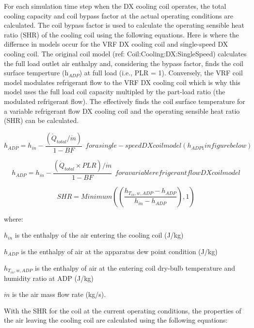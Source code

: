 For each simulation time step when the DX cooling coil operates, the total cooling capacity and coil bypass factor at the actual operating conditions are calculated. The coil bypass factor is used to calculate the operating sensible heat ratio (SHR) of the cooling coil using the following equations. Here is where the differnce in models occur for the VRF DX cooling coil and single-speed DX cooling coil. The original coil model (ref: Coil:Cooling:DX:SingleSpeed) calculates the full load outlet air enthalpy and, considering the bypass factor, finds the coil surface temperture (h\(_{ADP}\)) at full load (i.e., PLR = 1). Conversely, the VRF coil model modulates refrigerant flow to the VRF DX cooling coil which is why this model uses the full load coil capacity multipled by the part-load ratio (the modulated refrigerant flow). The effectively finds the coil surface temperature for a variable refrigerant flow DX cooling coil and the operating sensible heat ratio (SHR) can be calculated.

\begin{equation}
{h_{ADP}} = {h_{in}} - \frac{{\left( {{\dot{Q}_{total}}/ \dot{m}} \right)}}{{1 - BF}} ~~for a single-speed DX coil model (h_{ADP1} in figure below)
\end{equation}

\begin{equation}
{h_{ADP}} = {h_{in}} - \frac{{\left( {{\dot{Q}_{total}} \times PLR} \right) / \dot{m}}}{{1 - BF}} ~~for a variable refrigerant flow DX coil model
\end{equation}

\begin{equation}
SHR = Minimum\left( {\left( {\frac{{{h_{T_{in},w,ADP}} - {h_{ADP}}}}{{{h_{in}} - {h_{ADP}}}}} \right),1} \right)
\end{equation}

where:

\({{h_{in}}}\) is the enthalpy of the air entering the cooling coil (J/kg)

\({{h_{ADP}}}\) is the enthalpy of air at the apparatus dew point condition (J/kg)

\({{h_{T_{in},w,ADP}}}\) is the enthalpy of air at the entering coil dry-bulb temperature and humidity ratio at ADP (J/kg)

\(\dot m\) is the air mass flow rate (kg/s).

With the SHR for the coil at the current operating conditions, the properties of the air leaving the cooling coil are calculated using the following equations:

